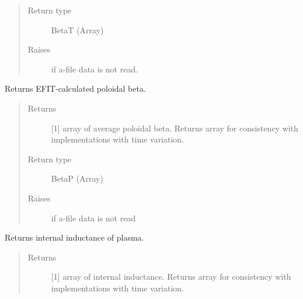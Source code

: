 \documentclass[letterpaper,10pt,english]{sphinxmanual}
\begin{document}
\begin{fulllineitems}
\begin{fulllineitems}
\begin{quote}
\begin{description}
\item[{Return type}] \leavevmode
BetaT (Array)

\item[{Raises}] \leavevmode
{} \textendash{} if a-file data is not read.

\end{description}\end{quote}

\end{fulllineitems}


\begin{fulllineitems}
\label{\detokenize{eqtools:eqtools.eqdskreader.EqdskReader.getBetaP}}
Returns EFIT-calculated poloidal beta.
\begin{quote}\begin{description}
\item[{Returns}] \leavevmode
{[}1{]} array of average poloidal beta.  Returns array
for consistency with
{\hyperref[\detokenize{eqtools:eqtools.core.Equilibrium}]{}}
implementations with time variation.

\item[{Return type}] \leavevmode
BetaP (Array)

\item[{Raises}] \leavevmode
{} \textendash{} if a-file data is not read

\end{description}\end{quote}

\end{fulllineitems}


\begin{fulllineitems}
\label{\detokenize{eqtools:eqtools.eqdskreader.EqdskReader.getLi}}
Returns internal inductance of plasma.
\begin{quote}\begin{description}
\item[{Returns}] \leavevmode
{[}1{]} array of internal inductance.  Returns array for
consistency with
{\hyperref[\detokenize{eqtools:eqtools.core.Equilibrium}]{}}
implementations with time variation.


\end{description}
\end{quote}
\end{fulllineitems}
\end{fulllineitems}
\end{document}
